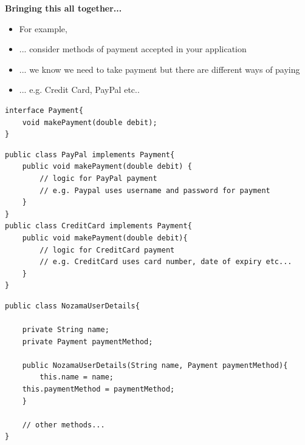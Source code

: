 \documentclass{beamer}
\begin{document}
\begin{frame}
\begin{center}
\textbf{Bringing this all together...}
\end{center}
\begin{itemize}
\item For example, 
\bigskip
\item ... consider methods of payment accepted in your application
\item ... we know we need to take payment but there are different ways of paying
\item ... e.g. Credit Card, PayPal etc..
\end{itemize}
\end{frame}

\begin{frame}[fragile]
\begin{block}{}
\begin{lstlisting}
interface Payment{
    void makePayment(double debit);
}
\end{lstlisting}
\end{block}
\end{frame}

\begin{frame}[fragile]
\begin{block}{}
\begin{lstlisting}
public class PayPal implements Payment{
    public void makePayment(double debit) {
        // logic for PayPal payment
        // e.g. Paypal uses username and password for payment
    }
}
public class CreditCard implements Payment{
    public void makePayment(double debit){
        // logic for CreditCard payment
        // e.g. CreditCard uses card number, date of expiry etc...
    }
}
\end{lstlisting}
\end{block}
\end{frame}

\begin{frame}[fragile]
\begin{block}{}
\begin{lstlisting}
public class NozamaUserDetails{
    
    private String name;
    private Payment paymentMethod;
    
    public NozamaUserDetails(String name, Payment paymentMethod){
    	this.name = name;
	this.paymentMethod = paymentMethod;
    }
    
    // other methods...
}
\end{lstlisting}
\end{block}
\end{frame}
\end{document}
